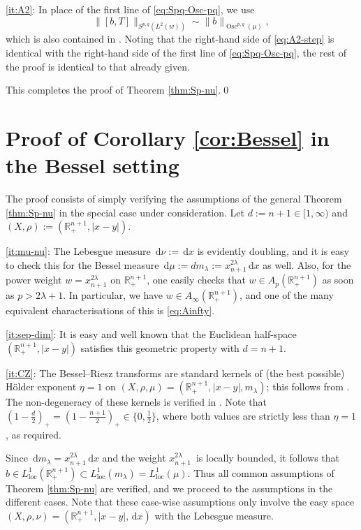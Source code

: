 \documentclass[reqno]{amsart}
\newcommand{\ud}[0]{\,\mathrm{d}}
\newcommand{\abs}[1]{|#1|}
\newcommand{\Norm}[2]{\|#1\|_{#2}}
\newcommand{\loc}[0]{\operatorname{loc}}
\newcommand{\R}{\mathbb{R}}
\theoremstyle{plain}
\theoremstyle{definition}
\theoremstyle{remark}
\begin{document}
\eqref{it:A2}: In place of the first line of \eqref{eq:Spq-Osc-pq}, we use
\begin{equation}\label{eq:A2-step}
  \Norm{[b,T]}{S^{p,q}(L^2(w))}\sim\Norm{b}{\operatorname{Osc}^{p,q}(\mu)},
\end{equation}
which is also contained in \cite[Proposition 1.26]{Hyt:Sp}. Noting that the right-hand side of \eqref{eq:A2-step} is identical with the right-hand side of the first line of \eqref{eq:Spq-Osc-pq}, the rest of the proof is identical to that already given.

This completes the proof of Theorem \ref{thm:Sp-nu}.\qed


\section{Proof of Corollary \ref{cor:Bessel} in the Bessel setting}\label{sec:Bessel}

The proof consists of simply verifying the assumptions of the general Theorem \ref{thm:Sp-nu} in the special case under consideration. Let $d:=n+1\in[1,\infty)$ and $(X,\rho):=(\R_+^{n+1},\abs{x-y})$.

\eqref{it:mu-nu}: The Lebesgue measure $\ud\nu:=\ud x$ is evidently doubling, and it is easy to check this for the Bessel measure $\ud\mu:=dm_\lambda:=x_{n+1}^{2\lambda}\ud x$ as well. Also, for the power weight $w=x_{n+1}^{2\lambda}$ on $\R_+^{n+1}$, one easily checks that $w\in A_p(\R_+^{n+1})$ as soon as $p>2\lambda+1$. In particular, we have $w\in A_\infty(\R_+^{n+1})$, and one of the many equivalent characterisations of this is \eqref{eq:Ainfty}.

\eqref{it:sep-dim}: It is easy and well known that the Euclidean half-space $(\R_+^{n+1},\abs{x-y})$ satisfies this geometric property with $d=n+1$.

\eqref{it:CZ}: The Bessel--Riesz transforms are standard kernels of (the best possible) H\"older exponent $\eta=1$ on $(X,\rho,\mu)=(\R_+^{n+1},\abs{x-y},m_\lambda)$; this follows from \cite[Lemma 2.5]{FLLX}. The non-degeneracy of these kernels is verified in \cite[Lemma 2.6]{FLLX}. Note that $(1-\frac{d}{2})_+=(1-\frac{n+1}{2})_+\in\{0,\frac12\}$, where both values are strictly less than $\eta=1$, as required.

Since $\ud m_\lambda=x_{n+1}^{2\lambda}\ud x$ and the weight $x_{n+1}^{2\lambda}$ is locally bounded, it follows that $b\in L^1_{\loc}(\R_+^{n+1})\subset L^1_{\loc}(m_\lambda)=L^1_{\loc}(\mu)$. Thus all common assumptions of Theorem \ref{thm:Sp-nu} are verified, and we proceed to the assumptions in the different cases. Note that these case-wise assumptions only involve the easy space $(X,\rho,\nu)=(\R_+^{n+1},\abs{x-y},\ud x)$ with the Lebesgue measure.
\end{document}
